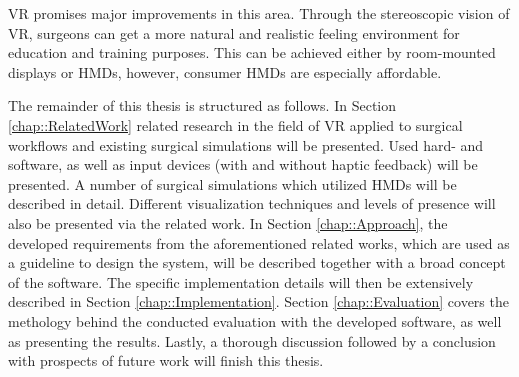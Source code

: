 VR promises major improvements in this area.
Through the stereoscopic vision of VR, surgeons can get a more natural and realistic feeling environment for education and training purposes.
This can be achieved either by room-mounted displays or HMDs, however, consumer HMDs are especially affordable.





The remainder of this thesis is structured as follows. 
In Section \ref{chap::RelatedWork} related research in the field of VR applied to surgical workflows and existing surgical simulations will be presented.
Used hard- and software, as well as input devices (with and without haptic feedback) will be presented.
A number of surgical simulations which utilized HMDs will be described in detail.
Different visualization techniques and levels of presence will also be presented via the related work.
In Section \ref{chap::Approach}, the developed requirements from the aforementioned related works, which are used as a guideline to design the system, will be described 
together with a broad concept of the software.
The specific implementation details will then be extensively described in Section \ref{chap::Implementation}.
Section \ref{chap::Evaluation} covers the methology behind the conducted evaluation with the developed software, as well as presenting the results.
Lastly, a thorough discussion followed by a conclusion with prospects of future work will finish this thesis.